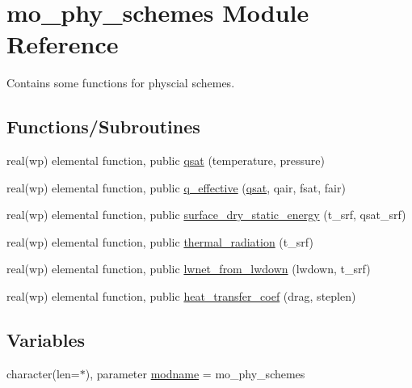 \hypertarget{namespacemo__phy__schemes}{}\section{mo\+\_\+phy\+\_\+schemes Module Reference}
\label{namespacemo__phy__schemes}


Contains some functions for physcial schemes.  


\subsection*{Functions/\+Subroutines}
\begin{DoxyCompactItemize}
\item 
real(wp) elemental function, public \hyperlink{namespacemo__phy__schemes_aa793f9cf2db7aa0f821bde8fbf8f38a8}{qsat} (temperature, pressure)
\item 
real(wp) elemental function, public \hyperlink{namespacemo__phy__schemes_a52234cb76d1efb2d2298d8fc66b61545}{q\+\_\+effective} (\hyperlink{namespacemo__phy__schemes_aa793f9cf2db7aa0f821bde8fbf8f38a8}{qsat}, qair, fsat, fair)
\item 
real(wp) elemental function, public \hyperlink{namespacemo__phy__schemes_afffc006f6b4ec423054e4e5f4943e19d}{surface\+\_\+dry\+\_\+static\+\_\+energy} (t\+\_\+srf, qsat\+\_\+srf)
\item 
real(wp) elemental function, public \hyperlink{namespacemo__phy__schemes_ad2fdf01327cefcddd7a762f414615551}{thermal\+\_\+radiation} (t\+\_\+srf)
\item 
real(wp) elemental function, public \hyperlink{namespacemo__phy__schemes_ace9a64c869caa711065208594ef8114e}{lwnet\+\_\+from\+\_\+lwdown} (lwdown, t\+\_\+srf)
\item 
real(wp) elemental function, public \hyperlink{namespacemo__phy__schemes_a9d1fe0b8e7cc0e86d2cf43ea5ebaac58}{heat\+\_\+transfer\+\_\+coef} (drag, steplen)
\end{DoxyCompactItemize}
\subsection*{Variables}
\begin{DoxyCompactItemize}
\item 
character(len=$\ast$), parameter \hyperlink{namespacemo__phy__schemes_a1bb1f1820a2d3f1246c68c21ab241ce6}{modname} = \textquotesingle{}mo\+\_\+phy\+\_\+schemes\textquotesingle{}
\end{DoxyCompactItemize}


